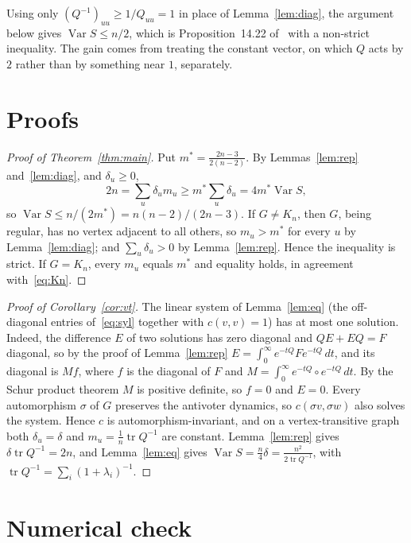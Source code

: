 \documentclass[11pt]{amsart}
\theoremstyle{remark}
\numberwithin{equation}{section}
\DeclareMathOperator{\Var}{Var}
\DeclareMathOperator{\tr}{tr}
\begin{document}
Using only $(Q^{-1})_{uu}\ge1/Q_{uu}=1$ in place of Lemma~\ref{lem:diag}, the argument below gives $\Var S\le n/2$,
which is Proposition~14.22 of~\cite{AF} with a non-strict inequality. The gain comes from treating the constant vector,
on which $Q$ acts by $2$ rather than by something near $1$, separately.

\section{Proofs}

\begin{proof}[Proof of Theorem~\ref{thm:main}]
Put $m^*=\frac{2n-3}{2(n-2)}$. By Lemmas~\ref{lem:rep} and~\ref{lem:diag}, and $\delta_u\ge0$,
\[
2n=\sum_u\delta_um_u\ge m^*\sum_u\delta_u=4m^*\Var S ,
\]
so $\Var S\le n/(2m^*)=n(n-2)/(2n-3)$. If $G\ne K_n$, then $G$, being regular, has no vertex adjacent to all others, so
$m_u>m^*$ for every $u$ by Lemma~\ref{lem:diag}; and $\sum_u\delta_u>0$ by Lemma~\ref{lem:rep}. Hence the inequality is
strict. If $G=K_n$, every $m_u$ equals $m^*$ and equality holds, in agreement with~\eqref{eq:Kn}.
\end{proof}

\begin{proof}[Proof of Corollary~\ref{cor:vt}]
The linear system of Lemma~\ref{lem:eq} (the off-diagonal entries of~\eqref{eq:syl} together with $c(v,v)=1$) has
at most one solution. Indeed, the difference $E$ of two solutions has zero diagonal and $QE+EQ=F$ diagonal, so by the
proof of Lemma~\ref{lem:rep} $E=\int_0^\infty e^{-tQ}Fe^{-tQ}\,dt$, and its diagonal is $Mf$, where $f$ is the diagonal
of $F$ and $M=\int_0^\infty e^{-tQ}\circ e^{-tQ}\,dt$. By the Schur product theorem $M$ is positive definite, so $f=0$
and $E=0$. Every automorphism $\sigma$ of $G$ preserves the antivoter dynamics, so $c(\sigma v,\sigma w)$ also solves
the system. Hence $c$ is
automorphism-invariant, and on a vertex-transitive graph both $\delta_u=\delta$ and $m_u=\frac1n\tr Q^{-1}$ are
constant. Lemma~\ref{lem:rep} gives $\delta\tr Q^{-1}=2n$, and Lemma~\ref{lem:eq} gives
$\Var S=\frac n4\delta=\frac{n^2}{2\tr Q^{-1}}$, with $\tr Q^{-1}=\sum_i(1+\lambda_i)^{-1}$.
\end{proof}

\section{Numerical check}
\end{document}
